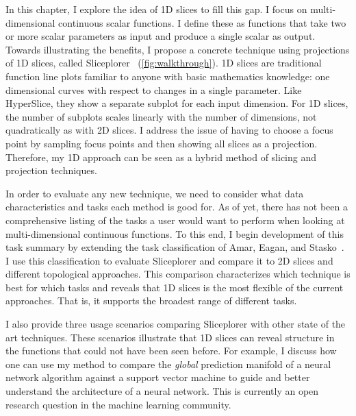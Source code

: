 
In this chapter, I explore the idea of 1D slices to fill this gap. I focus on
multi-dimensional continuous scalar functions. I define these as functions that
take two or more scalar parameters as input and produce a single scalar as
output.  Towards illustrating the benefits, I propose a concrete technique
using projections of 1D slices, called Sliceplorer~\cite{Torsney-Weir:2017a}
(\autoref{fig:walkthrough}).  1D slices are traditional function line plots
familiar to anyone with basic mathematics knowledge: one dimensional curves
with respect to changes in a single parameter.  Like HyperSlice, they show a
separate subplot for each input dimension. For 1D slices, the number of
subplots scales linearly with the number of dimensions, not quadratically as
with 2D slices. I address the issue of having to choose a focus point by
sampling focus points and then showing all slices as a projection. Therefore,
my 1D approach can be seen as a hybrid method of slicing and projection
techniques. 

In order to evaluate any new technique, we need to
consider what data characteristics and tasks each method is good for. As of yet, there has not been a comprehensive
listing of the tasks a user would want to perform when looking at
multi-dimensional continuous functions. To this
end, I begin development of this task summary by extending the task
classification of Amar, Eagan, and Stasko~\cite{Amar:2005}. I use this
classification to evaluate Sliceplorer and compare it to 2D slices and
different topological approaches. This comparison characterizes
which technique is best for which tasks and reveals that 1D slices is the most
flexible of the current approaches. That is, it supports the broadest range of
different tasks.

I also provide three usage scenarios comparing Sliceplorer with other state of the art techniques. These scenarios illustrate that 1D
slices can reveal structure in the functions that could not
have been seen before. For example, I discuss how one can use my
method to compare the \emph{global} prediction manifold of a neural
network algorithm against a support vector machine to guide and better understand the architecture of a neural network. This is currently an open research question in the machine learning community.


